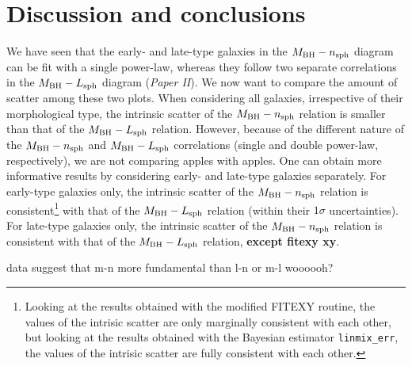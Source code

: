 \documentclass[preprint2]{emulateapj}
\begin{document}
\section{Discussion and conclusions} 
We have seen that the early- and late-type galaxies in the $M_{\rm BH} - n_{\rm sph}$ diagram can be fit with a single power-law, 
whereas they follow two separate correlations in the $M_{\rm BH} - L_{\rm sph}$ diagram (\emph{Paper II}). 
We now want to compare the amount of scatter among these two plots. 
When considering all galaxies, irrespective of their morphological type, 
the intrinsic scatter of the $M_{\rm BH} - n_{\rm sph}$ relation is smaller than that of the $M_{\rm BH} - L_{\rm sph}$ relation. 
However, because of the different nature of the $M_{\rm BH} - n_{\rm sph}$ and $M_{\rm BH} - L_{\rm sph}$ correlations 
(single and double power-law, respectively),  
we are not comparing apples with apples. 
One can obtain more informative results by considering early- and late-type galaxies separately. 
For early-type galaxies only, the intrinsic scatter of the $M_{\rm BH} - n_{\rm sph}$ relation is consistent\footnote{Looking 
at the results obtained with the modified FITEXY routine, 
the values of the intrisic scatter are only marginally consistent with each other, 
but looking at the results obtained with the Bayesian estimator {\tt linmix\_err}, 
the values of the intrisic scatter are fully consistent with each other. } with  
that of the $M_{\rm BH} - L_{\rm sph}$ relation (within their $1\sigma$ uncertainties). 
For late-type galaxies only, the intrinsic scatter of the $M_{\rm BH} - n_{\rm sph}$ relation is consistent with 
that of the $M_{\rm BH} - L_{\rm sph}$ relation, 
{\bf except fitexy xy}. 



data suggest that m-n more fundamental than l-n or m-l woooooh? \\
\end{document}
